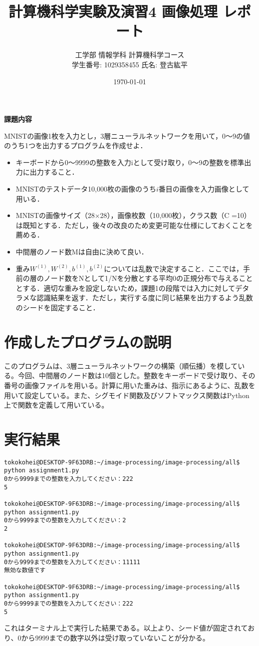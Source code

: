 \documentclass[11px,a4,dvipdfmx]{jsarticle}
\begin{document}
\title{計算機科学実験及演習4 画像処理 レポート}
\author{工学部 情報学科 計算機科学コース\\学生番号: 1029358455 氏名: 登古紘平}
\date{\today}
\maketitle
\newpage
\begin{center}
\textbf{課題内容}
\end{center}
MNISTの画像1枚を入力とし，3層ニューラルネットワークを用いて，0～9の値のうち1つを出力するプログラムを作成せよ．
\begin{itemize}
\item キーボードから0～9999の整数を入力iとして受け取り，0～9の整数を標準出力に出力すること．
\item MNISTのテストデータ10,000枚の画像のうち$i$番目の画像を入力画像として用いる．
\item MNISTの画像サイズ（28×28），画像枚数（10,000枚），クラス数（C =10）は既知とする．ただし，後々の改良のため変更可能な仕様にしておくことを薦める．
\item 中間層のノード数Mは自由に決めて良い．
\item 重み$W^{(1)},W^{(2)},b^{(1)},b^{(2)}$については乱数で決定すること．ここでは，手前の層のノード数をNとして1/Nを分散とする平均0の正規分布で与えることとする．適切な重みを設定しないため，課題1の段階では入力に対してデタラメな認識結果を返す．ただし，実行する度に同じ結果を出力するよう乱数のシードを固定すること．\\
\end{itemize}
\section{作成したプログラムの説明}
このプログラムは、3層ニューラルネットワークの構築（順伝播）を模している。今回、中間層のノード数は10個とした。整数をキーボードで受け取り、その番号の画像ファイルを用いる。計算に用いた重みは、指示にあるように、乱数を用いて設定している。また、シグモイド関数及びソフトマックス関数はPython上で関数を定義して用いている。
\section{実行結果}
\begin{verbatim}
tokokohei@DESKTOP-9F63DRB:~/image-processing/image-processing/all$ python assignment1.py 
0から9999までの整数を入力してください：222
5

tokokohei@DESKTOP-9F63DRB:~/image-processing/image-processing/all$ python assignment1.py 
0から9999までの整数を入力してください：2
2

tokokohei@DESKTOP-9F63DRB:~/image-processing/image-processing/all$ python assignment1.py 
0から9999までの整数を入力してください：11111
無効な数値です

tokokohei@DESKTOP-9F63DRB:~/image-processing/image-processing/all$ python assignment1.py 
0から9999までの整数を入力してください：222
5
\end{verbatim}
これはターミナル上で実行した結果である。以上より、シード値が固定されており、0から9999までの数字以外は受け取っていないことが分かる。
\end{document}
